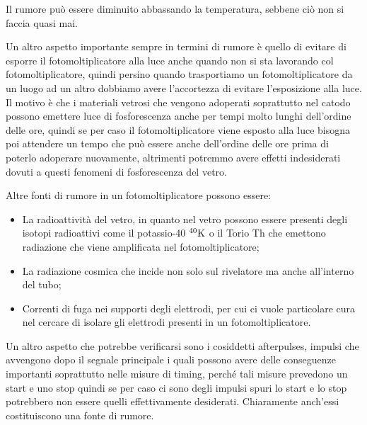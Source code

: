 Il rumore può essere diminuito abbassando la temperatura, sebbene ciò non si faccia quasi mai.

Un altro aspetto importante sempre in termini di rumore è quello di evitare di esporre il fotomoltiplicatore alla luce anche quando non si sta lavorando col fotomoltiplicatore, quindi persino quando trasportiamo un fotomoltiplicatore da un luogo ad un altro dobbiamo avere l'accortezza di evitare l'esposizione alla luce. Il motivo è che i materiali vetrosi che vengono adoperati soprattutto nel catodo possono emettere luce di fosforescenza anche per tempi molto lunghi dell'ordine delle ore, quindi se per caso il fotomoltiplicatore viene esposto alla luce bisogna poi attendere un tempo che può essere anche dell'ordine delle ore prima di poterlo adoperare nuovamente, altrimenti potremmo avere effetti indesiderati dovuti a questi fenomeni di fosforescenza del vetro. 

Altre fonti di rumore in un fotomoltiplicatore possono essere:

\begin{itemize}[leftmargin=0.5cm]
   \item La radioattività del vetro, in quanto nel vetro possono essere presenti degli isotopi radioattivi come il potassio-40 $\rm ^{40}K$ o il Torio Th che emettono radiazione che viene amplificata nel fotomoltiplicatore;
   \item La radiazione cosmica che incide non solo sul rivelatore ma anche all'interno del tubo;
   \item Correnti di fuga nei supporti degli elettrodi, per cui ci vuole particolare cura nel cercare di isolare gli elettrodi presenti in un fotomoltiplicatore.
\end{itemize}

Un altro aspetto che potrebbe verificarsi sono i cosiddetti afterpulses, impulsi che avvengono dopo il segnale principale i quali possono avere delle conseguenze importanti soprattutto nelle misure di timing, perché tali misure prevedono un start e uno stop quindi se per caso ci sono degli impulsi spuri lo start e lo stop potrebbero non essere quelli effettivamente desiderati. Chiaramente anch'essi costituiscono una fonte di rumore.

